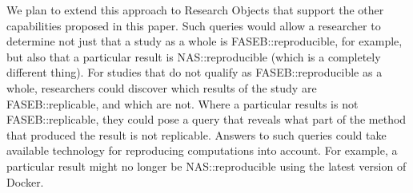 We plan to extend this approach to Research Objects that support the other capabilities
	proposed in this paper.
Such queries would allow a researcher to determine not just that a study as a whole
	is \textsf{FASEB::reproducible}, for example, but also that a particular result
	is \textsf{NAS::reproducible} (which is a completely different thing).
For studies that do not qualify as \textsf{FASEB::reproducible} as a whole, researchers
	could discover which results of the study are \textsf{FASEB::replicable}, and which are not.
Where a particular results is not \textsf{FASEB::replicable}, they could pose a query
	that reveals what part of the method that produced the result is 
	not replicable.
Answers to such queries could take available technology for reproducing computations
	into account.
For example, a particular result might no longer be NAS::reproducible using the
	latest version of Docker.



